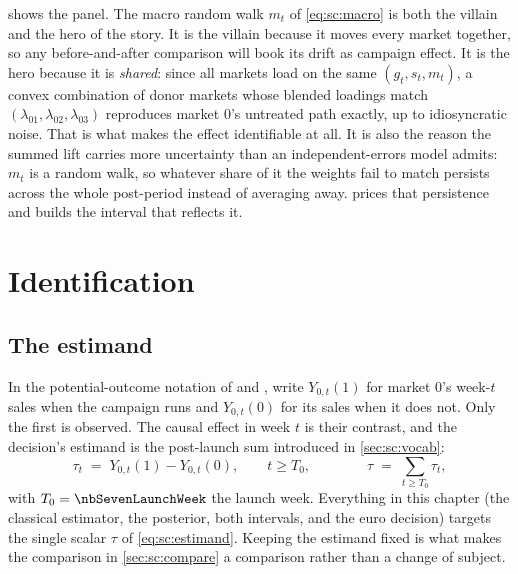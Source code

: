  shows the panel. The macro random walk $m_t$ of \cref{eq:sc:macro} is both
the villain and the hero of the story. It is the villain because it moves every market together,
so any before-and-after comparison will book its drift as campaign effect. It is the hero because
it is \emph{shared}: since all markets load on the same $(g_t, s_t, m_t)$, a convex combination
of donor markets whose blended loadings match $(\lambda_{01}, \lambda_{02}, \lambda_{03})$
reproduces market $0$'s untreated path exactly, up to idiosyncratic noise. That is what makes the
effect identifiable at all. It is also the reason the summed lift carries more uncertainty than an
independent-errors model admits: $m_t$ is a random walk, so whatever share of it the weights fail
to match persists across the whole post-period instead of averaging away. 
prices that persistence and builds the interval that reflects it.



\section{Identification}
\label{sec:sc:ident}

\subsection*{The estimand}

In the potential-outcome notation of \citet{rubin1974} and \citet{imbens2015}, write
$Y_{0,t}(1)$ for market $0$'s week-$t$ sales when the campaign runs and $Y_{0,t}(0)$ for its
sales when it does not. Only the first is observed. The causal effect in week $t$ is their
contrast, and the decision's estimand is the post-launch sum introduced in \cref{sec:sc:vocab}:
%
\begin{equation}
  \tau_t \;=\; Y_{0,t}(1) - Y_{0,t}(0), \qquad t \ge T_0,
  \qquad\qquad
  \tau \;=\; \sum_{t \ge T_0} \tau_t ,
  \label{eq:sc:estimand}
\end{equation}
%
with $T_0 = \nbSevenLaunchWeek$ the launch week. Everything in this chapter (the classical
estimator, the posterior, both intervals, and the euro decision) targets the single scalar
$\tau$ of \cref{eq:sc:estimand}. Keeping the estimand fixed is what makes the comparison in
\cref{sec:sc:compare} a comparison rather than a change of subject.

